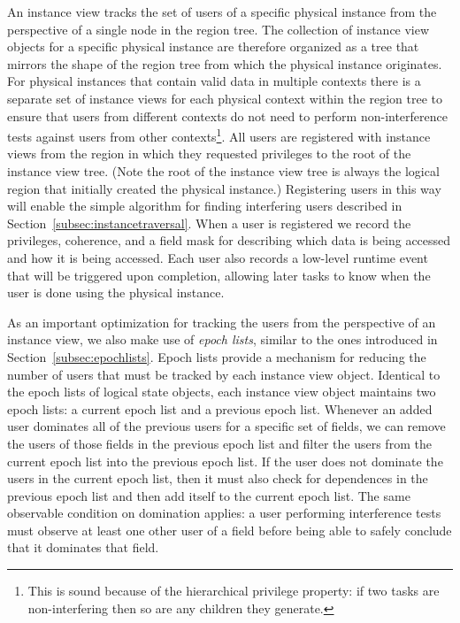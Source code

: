 An instance view tracks the set of users of a 
specific physical instance from the perspective of
a single node in the region tree. The collection 
of instance view objects for a specific physical 
instance are therefore organized as a tree that 
mirrors the shape of the region tree from which 
the physical instance originates. For physical 
instances that contain valid data in multiple
contexts there is a separate set of instance 
views for each physical context within the region 
tree to ensure that users from different contexts 
do not need to perform non-interference tests 
against users from other contexts\footnote{
This is sound because of the hierarchical privilege
property: if two tasks are non-interfering then so
are any children they generate.}. All users are 
registered with instance views from the region 
in which they requested privileges to the 
root of the instance view tree. (Note
the root of the instance view tree is 
always the logical region that initially
created the physical instance.) Registering
users in this way will enable the simple
algorithm for finding interfering users
described in Section~\ref{subsec:instancetraversal}.
When a user is registered we record the privileges, 
coherence, and a field mask for describing which 
data is being accessed and how it is being accessed.
Each user also records a low-level runtime
event that will be triggered upon completion,
allowing later tasks to know when the user
is done using the physical instance.

As an important optimization for tracking the
users from the perspective of an instance view,
we also make use of {\em epoch lists}, similar
to the ones introduced in Section~\ref{subsec:epochlists}.
Epoch lists provide a mechanism for reducing the
number of users that must be tracked by each
instance view object. Identical to the epoch
lists of logical state objects, each instance view
object maintains two epoch lists: a current epoch
list and a previous epoch list. Whenever an added 
user dominates all of the previous users for a 
specific set of fields, we can remove the 
users of those fields in the previous epoch list
and filter the users from the current epoch list
into the previous epoch list. If the user does
not dominate the users in the current epoch list,
then it must also check for dependences in the 
previous epoch list and then add itself to the
current epoch list. The same observable condition
on domination applies: a user performing interference
tests must observe at least one other user of 
a field before being able to safely conclude that
it dominates that field.

